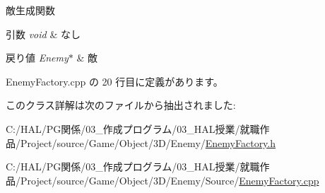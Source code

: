 敵生成関数 


\begin{DoxyParams}{引数}
{\em void} & なし \\
\hline
\end{DoxyParams}

\begin{DoxyRetVals}{戻り値}
{\em Enemy$\ast$} & 敵 \\
\hline
\end{DoxyRetVals}


 Enemy\+Factory.\+cpp の 20 行目に定義があります。



このクラス詳解は次のファイルから抽出されました\+:\begin{DoxyCompactItemize}
\item 
C\+:/\+H\+A\+L/\+P\+G関係/03\+\_\+作成プログラム/03\+\_\+\+H\+A\+L授業/就職作品/\+Project/source/\+Game/\+Object/3\+D/\+Enemy/\mbox{\hyperlink{_enemy_factory_8h}{Enemy\+Factory.\+h}}\item 
C\+:/\+H\+A\+L/\+P\+G関係/03\+\_\+作成プログラム/03\+\_\+\+H\+A\+L授業/就職作品/\+Project/source/\+Game/\+Object/3\+D/\+Enemy/\+Source/\mbox{\hyperlink{_enemy_factory_8cpp}{Enemy\+Factory.\+cpp}}\end{DoxyCompactItemize}
